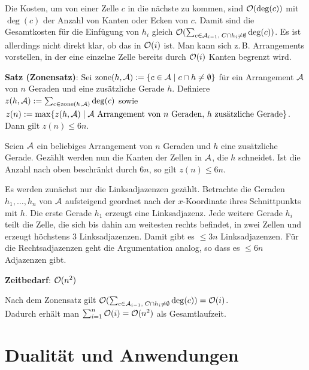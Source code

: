 Die Kosten, um von einer Zelle $c$ in die nächste zu kommen, sind $\mathcal{O}(\deg(c))$ mit
$\deg(c)$ der Anzahl von Kanten oder Ecken von $c$.
Damit sind die Gesamtkosten für die Einfügung von $h_i$ gleich
$\mathcal{O}(\sum_{c \in \mathcal{A}_{i-1},\; C \cap h_i \not= \emptyset} \deg(c))$.
Es ist allerdings nicht direkt klar, ob das in $\mathcal{O}(i)$ ist.
Man kann sich z.\,B. Arrangements vorstellen, in der eine einzelne Zelle bereits durch $\mathcal{O}(i)$
Kanten begrenzt wird.

\linie

\textbf{Satz (Zonensatz)}:
Sei $\operatorname{zone}(h, \mathcal{A}) := \{c \in \mathcal{A} \;|\; c \cap h \not= \emptyset\}$
für ein Arrangement $\mathcal{A}$ von $n$ Geraden und eine zusätzliche Gerade $h$.
Definiere $z(h, \mathcal{A}) := \sum_{c \in \operatorname{zone}(h, \mathcal{A})} \deg(c)$ sowie\\
$z(n) := \max\{z(h, \mathcal{A}) \;|\; \text{$\mathcal{A}$ Arrangement von $n$ Geraden, $h$ zusätzliche Gerade}\}$.\\
Dann gilt $z(n) \le 6n$.

\begin{Beweis}
    Seien $\mathcal{A}$ ein beliebiges Arrangement von $n$ Geraden und $h$ eine zusätzliche Gerade.
    Gezählt werden nun die Kanten der Zellen in $\mathcal{A}$, die $h$ schneidet.
    Ist die Anzahl nach oben beschränkt durch $6n$, so gilt $z(n) \le 6n$.

    Es werden zunächst nur die Linksadjazenzen gezählt.
    Betrachte die Geraden $h_1, \dotsc, h_n$ von $\mathcal{A}$ aufsteigend geordnet nach der $x$-Koordinate
    ihres Schnittpunkts mit $h$.
    Die erste Gerade $h_1$ erzeugt eine Linksadjazenz.
    Jede weitere Gerade $h_i$ teilt die Zelle, die sich bis dahin am weitesten rechts befindet,
    in zwei Zellen und erzeugt höchstens $3$ Linksadjazenzen.
    Damit gibt es $\le 3n$ Linksadjazenzen.
    Für die Rechtsadjazenzen geht die Argumentation analog, so dass es
    $\le 6n$ Adjazenzen gibt.
\end{Beweis}

\linie

\textbf{Zeitbedarf}:
$\mathcal{O}(n^2)$

\begin{Beweis}
    Nach dem Zonensatz gilt
    $\mathcal{O}(\sum_{c \in \mathcal{A}_{i-1},\; C \cap h_i \not= \emptyset} \deg(c)) = \mathcal{O}(i)$.\\
    Dadurch erhält man $\sum_{i=1}^n \mathcal{O}(i) = \mathcal{O}(n^2)$ als Gesamtlaufzeit.
\end{Beweis}

\pagebreak

\section{%
    Dualität und Anwendungen%
}

